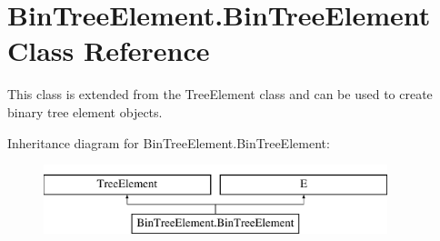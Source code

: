 \hypertarget{class_bin_tree_element_1_1_bin_tree_element}{}\section{Bin\+Tree\+Element.\+Bin\+Tree\+Element Class Reference}
\label{class_bin_tree_element_1_1_bin_tree_element}


This class is extended from the Tree\+Element class and can be used to create binary tree element objects.  


Inheritance diagram for Bin\+Tree\+Element.\+Bin\+Tree\+Element\+:\begin{figure}[H]
\begin{center}
\leavevmode
\includegraphics[height=2.000000cm]{class_bin_tree_element_1_1_bin_tree_element}
\end{center}
\end{figure}

